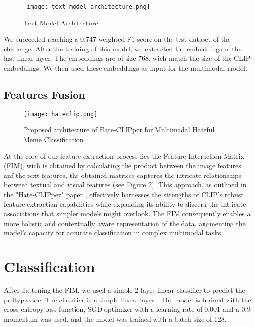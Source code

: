 \begin{figure}[H]
    \centering
    \texttt{[image: text-model-architecture.png]}
    \caption{Text Model Architecture}
    \label{fig:text-model}
\end{figure}


We succeeded reaching a 0.747 weighted F1-score on the test dataset of the challenge. After the training of this model, we extracted the embeddings of the last linear layer. The embeddings are of size 768, wich match the size of the CLIP embeddings. We then used these embeddings as input for the multimodal model.

\subsection{Features Fusion}

\begin{figure}[H]
    \centering
    \texttt{[image: hateclip.png]}
    \caption{\label{fig:hateclipper} Proposed architecture of Hate-CLIPper for Multimodal Hateful Meme Classification}

\end{figure}

At the core of our feature extraction process lies the Feature Interaction Matrix (FIM), wich is obtained by calculating the product between the image features anf the text features, the obtained matrices captures the intricate relationships between textual and visual features (see Figure \ref{fig:hateclipper}). This approach, as outlined in the "Hate-CLIPper" paper \cite{kumar2022hateclipper}, effectively harnesses the strengths of CLIP's robust feature extraction capabilities while expanding its ability to discern the intricate associations that simpler models might overlook. The FIM consequently enables a more holistic and contextually aware representation of the data, augmenting the model's capacity for accurate classification in complex multimodal tasks.

\section{Classification}

After flattening  the FIM, we used a simple 2 layer linear classifier to predict the prdtypecode. The classifier is a simple linear layer . The model is trained with the cross entropy loss function, SGD optimizer with a learning rate of 0.001 and a 0.9 momentum was used, and the model was trained with a batch size of 128.

